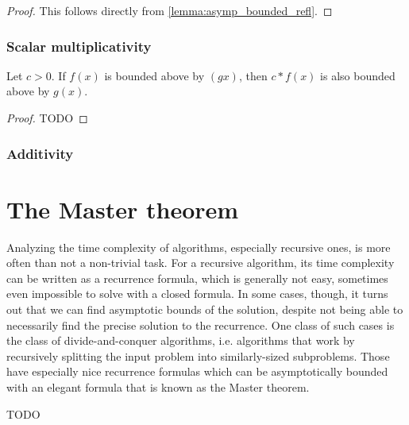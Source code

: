 \begin{proof}
    \leanok
    This follows directly from \ref{lemma:asymp_bounded_refl}.
\end{proof}


\subsubsection{Scalar multiplicativity}


\begin{lemma}
    \label{lemma:asymp_bounded_above_pos_smul}
    \leanok
    Let $c > 0$. If $f(x)$ is bounded above by $(gx)$, then $c*f(x)$ is also bounded
    above by $g(x)$.
\end{lemma}

\begin{proof}
    \leanok
    TODO
\end{proof}


\subsubsection{Additivity}


\section{The Master theorem}

Analyzing the time complexity of algorithms, especially recursive ones, is more often 
than not a non-trivial task. For a recursive algorithm, its time complexity can be 
written as a recurrence formula, which is generally not easy, sometimes even impossible 
to solve with a closed formula. In some cases, though, it turns out that we can find 
asymptotic bounds of the solution, despite not being able to necessarily find the 
precise solution to the recurrence. One class of such cases is the class of 
divide-and-conquer algorithms, i.e. algorithms that work by recursively splitting the input 
problem into similarly-sized subproblems. Those have especially nice recurrence formulas 
which can be asymptotically bounded with an elegant formula that is known as the Master theorem.

\begin{theorem}
TODO
\end{theorem}
